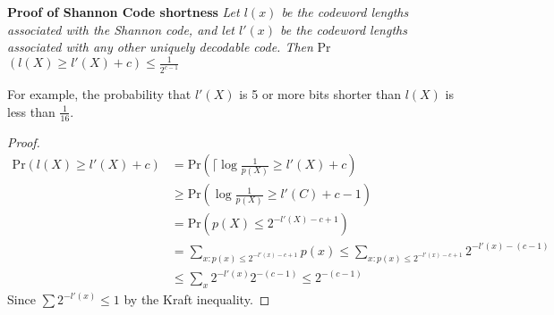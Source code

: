 \documentclass[10pt]{article}
\begin{document}
\begin{tiny}
\begin{multicols}{3}



\textbf{\scriptsize Proof of Shannon Code shortness}
{\it Let $l(x)$ be the codeword lengths associated with the Shannon code, and let $l'(x)$ be the codeword lengths associated with any other uniquely decodable code. Then} Pr$(l(X) \geq l'(X) + c)\leq \frac{1}{2^{c-1}}$

For example, the probability that $l'(X)$ is 5 or more bits shorter than $l(X)$ is less than $\frac{1}{16}$. 

\begin{proof}
\begin{align*}
\text{Pr}(l(X) \geq l'(X) + c)
&= \text{Pr}\left(\lceil \log \frac{1}{p(X)} \geq l'(X) + c \right) \\
&\geq \text{Pr}\left( \log \frac{1}{p(X)} \geq l'(C) + c - 1 \right)\\
&=\text{Pr}\left( p(X) \leq 2^{-l'(X)-c+1}\right) \\
&=\sum_{x:p(x)\leq 2^{-l'(x)-c+1}} p(x)
\leq \sum_{x:p(x)\leq 2^{-l'(x)-c+1}}2^{-l'(x)-(c-1)} \\
&\leq \sum_{x}2^{-l'(x)}2^{-(c-1)}
\leq 2^{-(c-1)} 
\end{align*}
Since $\sum 2^{-l'(x)} \leq 1$ by the Kraft inequality.
\end{proof}


\end{multicols}
\end{tiny}
\end{document}
